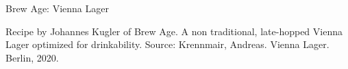 \documentclass[parskip=half,fontsize=9pt,oneside]{scrbook}
\begin{document}
\mainmatter

 
\begin{recipe}{Brew Age: Vienna Lager}

\begin{aboutblock}
Recipe by Johannes Kugler of Brew Age. A non traditional, late-hopped
Vienna Lager optimized for drinkability. Source: Krennmair, Andreas. Vienna Lager. Berlin, 2020.
\end{aboutblock}


\begin{methodandtiming}

\begin{mashsteps}
\end{mashsteps}

\begin{fermentationsteps}
\end{fermentationsteps}

\end{methodandtiming}

\recipebreak

\begin{ingredientsblock}

\begin{malts}
\end{malts}

\begin{hops}
\end{hops}


\end{ingredientsblock}

\end{recipe}

%
\end{document}
